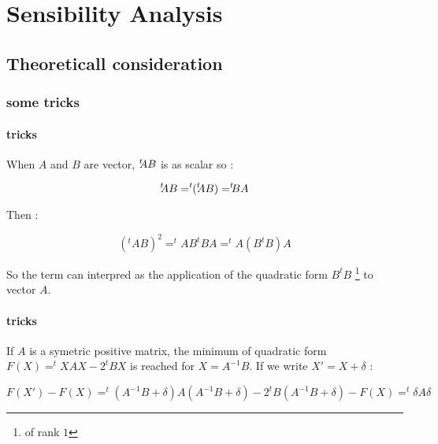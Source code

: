 \chapter{Sensibility Analysis}


\section{Theoreticall consideration}

\subsection{some tricks}

\subsubsection{tricks}
When $A$ and $B$ are vector, $ ^{t} \!\! A  B$ is as scalar so :


\begin{equation}
     \transs A B =  \transs ( \transs A B) =  \transss B A  \label{Trick:tABEqtBA}
\end{equation}

Then  :

\begin{equation}
     (^t A  B) ^2 =  ^t A B ^t B A  = ^t A (B ^t B) A \label{Trick:tAB2}
\end{equation}

So the term can interpred as the application of the quadratic form $B ^t B$  \footnote{of rank $1$}  to vector $A$.

\subsubsection{tricks}

If $A$ is a symetric positive matrix,
the minimum of quadratic form $F(X) = ^t X A X - 2^t B X$ is reached for $X=A^{-1} B$.
If we write $X' = X + \delta $ :

\begin{equation}
  F(X') -F(X)  = ^t (A^{-1} B+\delta) A (A^{-1} B+\delta) -  2^t B (A^{-1} B + \delta) -F(X)
          =  ^t \delta A \delta 
\end{equation}

